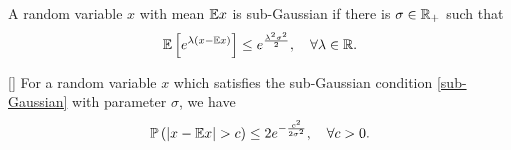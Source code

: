 \begin{definition}\label{sub-Gaussian}
   A random variable $x$ with mean $\mathbb{E} x$ is sub-Gaussian if there is $\sigma\in\mathbb{R}_+$ such that
   \begin{align}
       \mathbb{E}\left[e^{\lambda(x-\mathbb{E} x)}\right]\leq e^{\frac{\lambda^2\sigma^2}{2}},\quad \forall\lambda\in\mathbb{R}.\notag
   \end{align}
\end{definition}

\begin{proposition}\label{prop-A5}[\citep{wainwright2019high}]
    For a random variable $x$ which satisfies the sub-Gaussian condition \ref{sub-Gaussian} with parameter $\sigma$, we have
    \begin{align}\label{eq-subGaussian-prob}
        \bbP\left(|x-\bbE x|>c\right)\leq 2e^{-\frac{c^2}{2\sigma^2}},\quad \forall c>0.
    \end{align}
\end{proposition}


